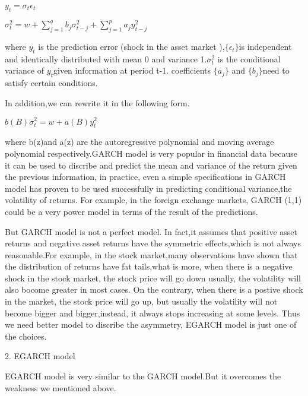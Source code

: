 \documentclass[10pt,a4paper]{article}
\begin{document}
\begin{center}$\displaystyle y_t=\sigma_t\epsilon_t$\end{center}

\begin{center} $\displaystyle \sigma_t^2=w+\sum_{j=1}^{q}b_j\sigma^2_{t-j}+\sum_{j=1}^{p}a_jy^2_{t-j} $ \end{center}

where $y_t$ is the prediction error (shock in the asset market ),$ \{ \epsilon_t\} $is independent and identically distributed with mean 0 and variance 1.$\sigma^2_t$ is the conditional variance of $y_t $given information at period t-1.
coefficients $\{a_j\}$ and $\{b_j\}$need to satisfy certain conditions.

In addition,we can rewrite it in the following form.

\begin{center}$\displaystyle b(B)\sigma^2_t=w+a(B)y^2_t$\end{center} 

where b(z)and a(z) are the autoregressive polynomial and moving average polynomial respectively.GARCH model is very popular in financial data because it can be used to discribe and predict the mean and variance of the return given the previous information, in practice, even a simple specifications in GARCH model has proven to be used successfully in predicting conditional variance,the volatility of returns. For example, in the foreign exchange markets, GARCH (1,1) could be a very power model in terms of the result of the predictions.

  But GARCH model is not a perfect model. In fact,it assumes that positive asset returns and negative asset returns have the symmetric effects,which is not always reasonable.For example, in the stock market,many observations have shown that the distribution of returns have fat tails,what is more, when there is a negative shock in the stock market, the stock price will go down usually, the volatility will also bocome greater in most cases. On the contrary, when there is a postive shock in the market, the stock price will go up, but usually the volatility will not become bigger and bigger,instead, it always stops increasing at some levels. Thus we need better model to discribe the asymmetry, EGARCH model is just one of the choices.

\vspace{0.5cm}

2. EGARCH model

 EGARCH model is very similar to the GARCH model.But it overcomes the weakness we mentioned above. 
\end{document}
